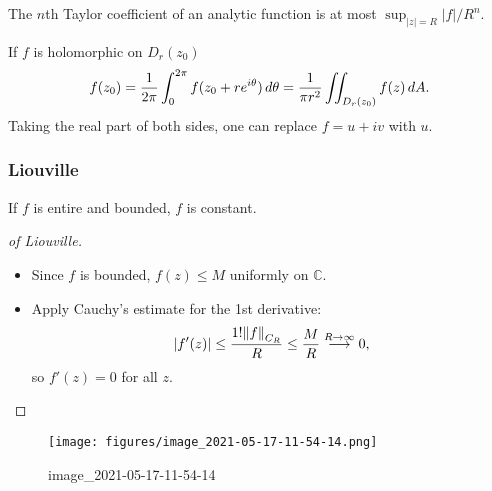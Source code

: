 \begin{slogan}

The \(n\)th Taylor coefficient of an analytic function is at most
\(\sup_{{\left\lvert {z} \right\rvert} = R} {\left\lvert {f} \right\rvert}/R^n\).

\end{slogan}

\begin{theorem}

If \(f\) is holomorphic on \(D_r(z_0)\)
\begin{align*}
f(z_0) 
= {1\over 2\pi} \int_0^{2\pi} f(z_0 + re^{i\theta}) \,d\theta
= {1\over \pi r^2} \iint_{D_r(z_0)} f(z)\, dA
.\end{align*}
Taking the real part of both sides, one can replace \(f=u+iv\) with
\(u\).

\end{theorem}

\hypertarget{liouville}{%
\subsubsection{Liouville}\label{liouville}}

\begin{theorem}\label{Liouville}

If \(f\) is entire and bounded, \(f\) is constant.

\end{theorem}

\begin{proof}[of Liouville]

\envlist

\begin{itemize}
\tightlist
\item
  Since \(f\) is bounded, \(f(z) \leq M\) uniformly on \({\mathbb{C}}\).
\item
  Apply Cauchy's estimate for the 1st derivative:
  \begin{align*}
  {\left\lvert {f'(z)} \right\rvert} \leq { 1! {\left\lVert {f} \right\rVert}_{C_R} \over R } \leq {M \over R}\overset{R\to\infty}\longrightarrow 0
  ,\end{align*}
  so \(f'(z) = 0\) for all \(z\).
\end{itemize}

\end{proof}

\begin{exercise}[?]

\begin{figure}
\centering
\texttt{[image: figures/image\_2021-05-17-11-54-14.png]}
\caption{image\_2021-05-17-11-54-14}
\end{figure}

\end{exercise}

